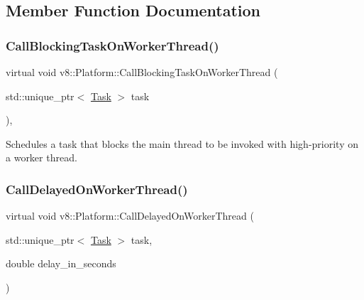 \subsection{Member Function Documentation}
\mbox{\label{classv8_1_1Platform_ada31b440048763bf8d9c296ca4cf2e1b}} 
\subsubsection{\texorpdfstring{Call\+Blocking\+Task\+On\+Worker\+Thread()}{CallBlockingTaskOnWorkerThread()}}
{\footnotesize\ttfamily virtual void v8\+::\+Platform\+::\+Call\+Blocking\+Task\+On\+Worker\+Thread (\begin{DoxyParamCaption}\item[{std\+::unique\+\_\+ptr$<$ \mbox{\hyperlink{classv8_1_1Task}{Task}} $>$}]{task }\end{DoxyParamCaption})\hspace{0.3cm}{\ttfamily [inline]}, {\ttfamily [virtual]}}

Schedules a task that blocks the main thread to be invoked with high-\/priority on a worker thread. \mbox{\label{classv8_1_1Platform_a808b0e55ed3efca10ebca031bbd6ecc6}} 
\subsubsection{\texorpdfstring{Call\+Delayed\+On\+Worker\+Thread()}{CallDelayedOnWorkerThread()}}
{\footnotesize\ttfamily virtual void v8\+::\+Platform\+::\+Call\+Delayed\+On\+Worker\+Thread (\begin{DoxyParamCaption}\item[{std\+::unique\+\_\+ptr$<$ \mbox{\hyperlink{classv8_1_1Task}{Task}} $>$}]{task,  }\item[{double}]{delay\+\_\+in\+\_\+seconds }\end{DoxyParamCaption})\hspace{0.3cm}{\ttfamily [pure virtual]}}

